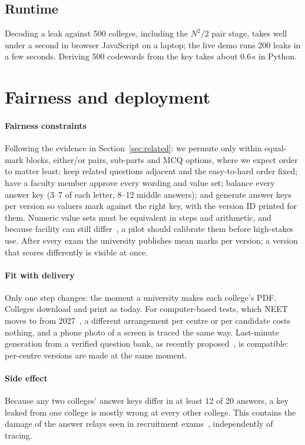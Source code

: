 \documentclass[10pt,a4paper]{article}
\theoremstyle{remark}
\begin{document}
\subsection{Runtime}
Decoding a leak against 500 colleges, including the $N^2/2$ pair stage, takes well under a second in browser JavaScript on a laptop; the live demo runs 200 leaks in a few seconds. Deriving 500 codewords from the key takes about 0.6\,s in Python.

\section{Fairness and deployment}
\label{sec:fair}
\label{sec:deploy}

\paragraph{Fairness constraints} Following the evidence in Section~\ref{sec:related}: we permute only within equal-mark blocks, either/or pairs, sub-parts and MCQ options, where we expect order to matter least; keep related questions adjacent and the easy-to-hard order fixed; have a faculty member approve every wording and value set; balance every answer key (3--7 of each letter, 8--12 middle answers); and generate answer keys per version so valuers mark against the right key, with the version ID printed for them. Numeric value sets must be equivalent in steps and arithmetic, and because facility can still differ~\citep{westacott2023}, a pilot should calibrate them before high-stakes use. After every exam the university publishes mean marks per version; a version that scores differently is visible at once.

\paragraph{Fit with delivery} Only one step changes: the moment a university makes each college's PDF. Colleges download and print as today. For computer-based tests, which NEET moves to from 2027~\citep{quint2026cbt}, a different arrangement per centre or per candidate costs nothing, and a phone photo of a screen is traced the same way. Last-minute generation from a verified question bank, as recently proposed~\citep{bs2026nilekani,iiith2026}, is compatible: per-centre versions are made at the same moment.

\paragraph{Side effect} Because any two colleges' answer keys differ in at least 12 of 20 answers, a key leaked from one college is mostly wrong at every other college. This contains the damage of the answer relays seen in recruitment exams~\citep{tnm2023tspsc}, independently of tracing.
\end{document}
